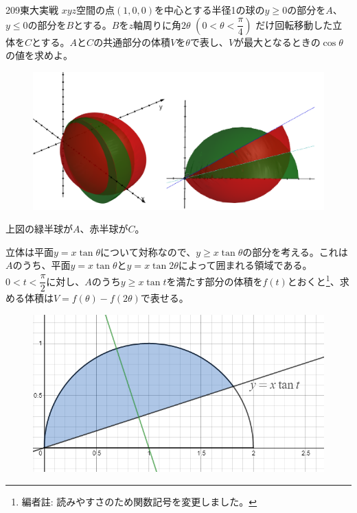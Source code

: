 \begin{thm}{209}{}{東大実戦}
 $xyz$空間の点$(1,0,0)$を中心とする半径1の球の$y\ge 0$の部分を$A$、$y\le 0$の部分を$B$とする。$B$を$z$軸周りに角$2\theta$ $(0<\theta<\dfrac{\pi}{4})$ だけ回転移動した立体を$C$とする。$A$と$C$の共通部分の体積$V$を$\theta$で表し、$V$が最大となるときの$\cos\theta$の値を求めよ。
\end{thm}

\begin{figure}[H]
 \centering
 \includegraphics[width=0.7\linewidth]{../problems/Q_209/A_209_1.png}
\end{figure}

上図の緑半球が$A$、赤半球が$C$。

立体は平面$y=x\tan\theta$について対称なので、$y\ge x\tan\theta$の部分を考える。これは$A$のうち、平面$y=x\tan\theta$と$y=x\tan2\theta$によって囲まれる領域である。$0<t<\dfrac{\pi}{2}$に対し、$A$のうち$y\ge x\tan t$を満たす部分の体積を$f(t)$とおくと\footnote{編者註: 読みやすさのため関数記号を変更しました。}、求める体積は$V=f(\theta)-f(2\theta)$で表せる。

\begin{figure}[H]
 \centering
 \includegraphics[width=0.6\linewidth]{../problems/Q_209/A_209_2.png}
\end{figure}

